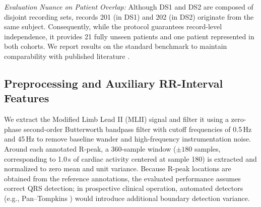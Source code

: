 \documentclass[conference]{IEEEtran}
\begin{document}
\textit{Evaluation Nuance on Patient Overlap:} Although DS1 and DS2 are composed of disjoint recording sets, records 201 (in DS1) and 202 (in DS2) originate from the same subject. Consequently, while the protocol guarantees record-level independence, it provides 21 fully unseen patients and one patient represented in both cohorts. We report results on the standard benchmark to maintain comparability with published literature \cite{b3,b12}.

\begin{table}[t]
\centering
\caption{Heartbeat Distribution Across Inter-Patient Partitions}
\label{tab:split}
\end{table}

\subsection{Preprocessing and Auxiliary RR-Interval Features}
We extract the Modified Limb Lead II (MLII) signal and filter it using a zero-phase second-order Butterworth bandpass filter with cutoff frequencies of 0.5\,Hz and 45\,Hz to remove baseline wander and high-frequency instrumentation noise. Around each annotated R-peak, a 360-sample window ($\pm180$ samples, corresponding to 1.0\,s of cardiac activity centered at sample 180) is extracted and normalized to zero mean and unit variance. Because R-peak locations are obtained from the reference annotations, the evaluated performance assumes correct QRS detection; in prospective clinical operation, automated detectors (e.g., Pan--Tompkins \cite{b10}) would introduce additional boundary detection variance.
\end{document}
